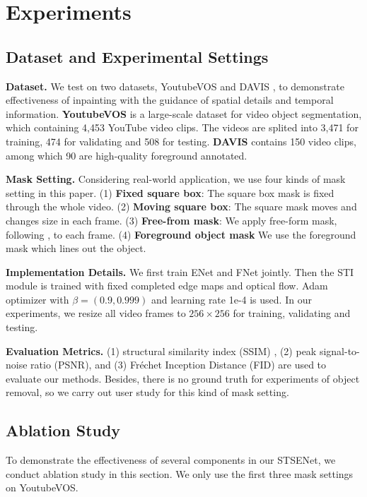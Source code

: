 \section{Experiments}
\subsection{Dataset and Experimental Settings}
\textbf{Dataset.} We test on two datasets, YoutubeVOS \cite{xu2018youtube} and DAVIS \cite{davis_2017}, to demonstrate effectiveness of inpainting with the guidance of spatial details and temporal information.
\textbf{YoutubeVOS} is a large-scale dataset for video object segmentation, which containing 4,453 YouTube video clips. The videos are splited into 3,471 for training, 474 for validating and 508 for testing.
\textbf{DAVIS} contains 150 video clips, among which 90 are high-quality foreground annotated. 


\noindent \textbf{Mask Setting.} Considering real-world application, we use four kinds of mask setting in this paper. (1) \textbf{Fixed square box}: The square box mask is fixed through the whole video. (2) \textbf{Moving square box}: The square mask moves and changes size in each frame. (3) \textbf{Free-from mask}: We apply free-form mask, following \cite{liu2018partialinpainting}, to each frame. (4) \textbf{Foreground object mask} We use the foreground mask which lines out the object.

\noindent \textbf{Implementation Details.} We first train ENet and FNet jointly. Then the STI module is trained with fixed completed edge maps and optical flow. Adam optimizer with $\beta=(0.9, 0.999)$ and learning rate 1e-4 is used.
In our experiments, we resize all video frames to $256\times256$ for training, validating and testing.

\noindent \textbf{Evaluation Metrics.} (1) structural similarity index (SSIM) \cite{wang2004image}, (2) peak signal-to-noise ratio (PSNR), and (3) Fr{\'e}chet Inception Distance (FID) \cite{heusel2017gans} are used to evaluate our methods. 
Besides, there is no ground truth for experiments of object removal, so we carry out user study for this kind of mask setting. 


\subsection{Ablation Study}
To demonstrate the effectiveness of several components in our STSENet, we conduct ablation study in this section. We only use the first three mask settings on YoutubeVOS.

